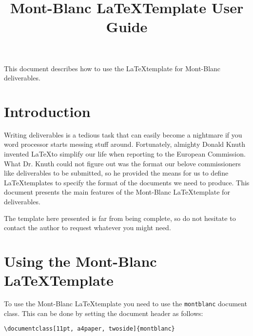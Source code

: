 \documentclass[11pt, a4paper, twoside]{montblanc}
\begin{document}
\title{Mont-Blanc \LaTeX Template User Guide}

\maketitle

\begin{changelog}
\end{changelog}

\frontmatter

\begin{executive}
This document describes how to use the \LaTeX template for Mont-Blanc deliverables.
\end{executive}

\section{Introduction}
Writing deliverables is a tedious task that can easily become a nightmare if you word processor 
starts messing stuff around. Fortunately, almighty Donald Knuth invented \LaTeX to simplify our life 
when reporting to the European Commission. What Dr. Knuth could not figure out was the format our 
belove commissioners like deliverables to be submitted, so he provided the means for us to define 
\LaTeX templates to specify the format of the documents we need to produce. This document presents 
the main features of the Mont-Blanc \LaTeX template for deliverables.

The template here presented is far from being complete, so do not hesitate to contact the author to 
request whatever you might need.

\section{Using the Mont-Blanc \LaTeX Template}
To use the Mont-Blanc \LaTeX template you need to use the \texttt{montblanc} document class. This 
can be done by setting the document header as follows:
\begin{verbatim}
\documentclass[11pt, a4paper, twoside]{montblanc}
\end{verbatim}
\end{document}
